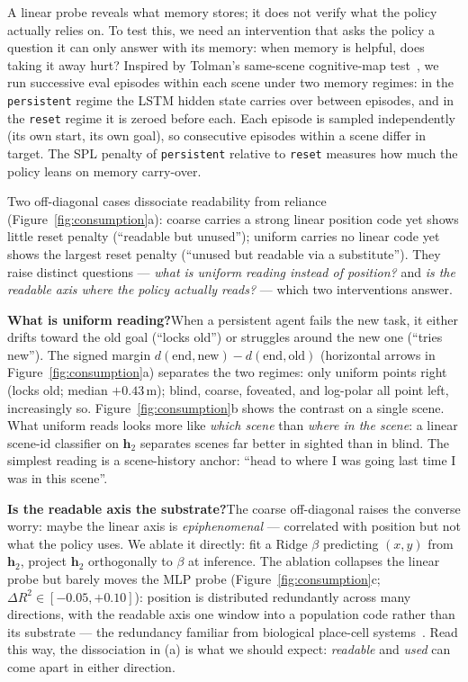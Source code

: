 \documentclass{article}
\newcommand{\uncertain}[1]{#1}
\begin{document}
A linear probe reveals what memory stores; it does not verify what the policy actually relies on. To test this, we need an intervention that asks the policy a question it can only answer with its memory: when memory is helpful, does taking it away hurt? Inspired by Tolman's same-scene cognitive-map test~\citep{tolman1948cognitive}, we run successive eval episodes within each scene under two memory regimes: in the \texttt{persistent} regime the LSTM hidden state carries over between episodes, and in the \texttt{reset} regime it is zeroed before each. Each episode is sampled independently (its own start, its own goal), so consecutive episodes within a scene differ in target. The SPL penalty of \texttt{persistent} relative to \texttt{reset} measures how much the policy leans on memory carry-over.

\noindent Two off-diagonal cases dissociate readability from reliance (Figure~\ref{fig:consumption}a): coarse carries a strong linear position code yet shows little reset penalty (``readable but unused''); uniform carries no linear code yet shows the largest reset penalty (``unused but readable via a substitute''). They raise distinct questions --- \emph{what is uniform reading instead of position?} and \emph{is the readable axis where the policy actually reads?} --- which two interventions answer.

\noindent\textbf{What is uniform reading?}\quad When a persistent agent fails the new task, it either drifts toward the old goal (``locks old'') or struggles around the new one (``tries new''). The signed margin $d(\text{end},\text{new}){-}d(\text{end},\text{old})$ (horizontal arrows in Figure~\ref{fig:consumption}a) separates the two regimes: only uniform points right (locks old; median $+0.43$\,m); blind, coarse, foveated, and log-polar all point left, increasingly so. Figure~\ref{fig:consumption}b shows the contrast on a single scene. What uniform reads looks more like \emph{which scene} than \emph{where in the scene}: a linear scene-id classifier on $\mathbf{h}_2$ separates scenes far better in sighted than in blind. \uncertain{The simplest reading is a scene-history anchor: ``head to where I was going last time I was in this scene''.}

\noindent\textbf{Is the readable axis the substrate?}\quad The coarse off-diagonal raises the converse worry: maybe the linear axis is \emph{epiphenomenal} --- correlated with position but not what the policy uses. We ablate it directly: fit a Ridge $\beta$ predicting $(x,y)$ from $\mathbf{h}_2$, project $\mathbf{h}_2$ orthogonally to $\beta$ at inference. The ablation collapses the linear probe but barely moves the MLP probe (Figure~\ref{fig:consumption}c; $\Delta R^2 \in [-0.05, +0.10]$): position is distributed redundantly across many directions, with the readable axis one window into a population code rather than its substrate --- the redundancy familiar from biological place-cell systems~\citep{stringer2019high}. Read this way, the dissociation in (a) is what we should expect: \emph{readable} and \emph{used} can come apart in either direction.
\end{document}
